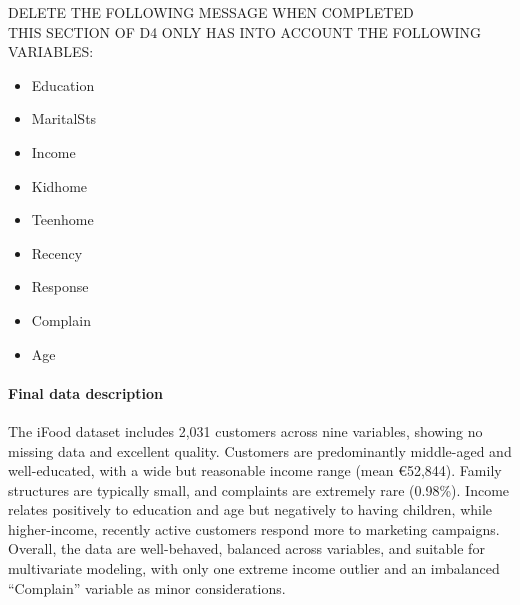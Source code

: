 \documentclass{article}
\begin{document}
{\large
    DELETE THE FOLLOWING MESSAGE WHEN COMPLETED
}
\\  
    THIS SECTION OF D4 ONLY HAS INTO ACCOUNT THE FOLLOWING VARIABLES:
    \begin{itemize}
        \item Education
        \item MaritalSts
        \item Income 
        \item Kidhome
        \item Teenhome
        \item Recency
        \item Response
        \item Complain
        \item Age
    \end{itemize}





\paragraph{{Final data description}}

The iFood dataset includes 2,031 customers across nine variables, showing no missing data and excellent quality. Customers are predominantly middle-aged and well-educated, with a wide but reasonable income range (mean €52,844). Family structures are typically small, and complaints are extremely rare (0.98\%). Income relates positively to education and age but negatively to having children, while higher-income, recently active customers respond more to marketing campaigns. Overall, the data are well-behaved, balanced across variables, and suitable for multivariate modeling, with only one extreme income outlier and an imbalanced “Complain” variable as minor considerations.
\end{document}
